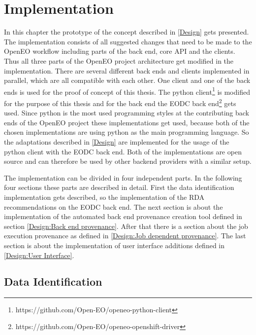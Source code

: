 \documentclass[draft,final]{vutinfth} %
\begin{document}

\chapter{Implementation}\label{Implementation}
In this chapter the prototype of the concept described in \ref{Design} gets presented. The implementation consists of all suggested changes that need to be made to the OpenEO workflow including parts of the back end, core API and the clients. Thus all three parts of the OpenEO project architecture get modified in the implementation. There are several different back ends and clients implemented in parallel, which are all compatible with each other. One client and one of the back ends is used for the proof of concept of this thesis. The python client\footnote{https://github.com/Open-EO/openeo-python-client} is modified for the purpose of this thesis and for the back end the EODC back end\footnote{https://github.com/Open-EO/openeo-openshift-driver} gets used. Since python is the most used programming styles at the contributing back ends of the OpenEO project these implementations get used, because both of the chosen implementations are using python as the main programming language. So the adaptations described in \ref{Design} are implemented for the usage of the python client with the EODC back end. Both of the implementations are open source and can therefore be used by other backend providers with a similar setup.  

The implementation can be divided in four independent parts. In the following four sections these parts are described in detail. First the data identification implementation gets described, so the implementation of the RDA recommendations on the EODC back end. The next section is about the implementation of the automated back end provenance creation tool defined in section \ref{Design:Back end provenance}. After that there is a section about the job execution provenance as defined in \ref{Design:Job dependent provenance}. The last section is about the implementation of user interface additions defined in \ref{Design:User Interface}.     

\section{Data Identification}\label{Implementation:Data Identification}
\end{document}
